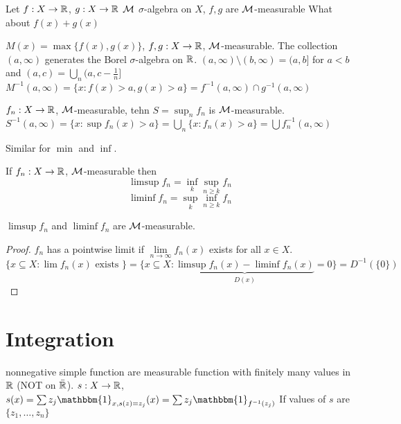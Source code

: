 Let $f: X \to \mathbb R$, $g: X \to \mathbb R$ $\mathcal M$ $\sigma$-algebra on $X$, $f, g$ are $\mathcal M$-measurable
What about $f(x) + g(x)$

$M(x) = \max\{f(x), g(x)\}$, $f,g: X \to \mathbb R$, $\mathcal M$-measurable.
The collection $(a, \infty)$ generates the Borel $\sigma$-algebra on $\mathbb R$.
$(a, \infty) \setminus (b, \infty) = (a, b]$ for $a < b$ and $(a, c) = \bigcup_n (a, c - \frac1n]$
$M^{-1}(a, \infty) = \{x : f(x) > a, g(x) > a\} = f^{-1}(a, \infty) \cap g^{-1}(a, \infty)$

$f_n: X \to \mathbb R$, $\mathcal M$-measurable, tehn $S = \sup_n f_n$ is $\mathcal M$-measurable.
$S^{-1}(a, \infty) = \{x : \sup f_n(x) > a\} = \bigcup_n \{x : f_n(x) > a\} = \bigcup f_n^{-1}(a, \infty)$

Similar for $\min$ and $\inf$.

\begin{definition}
If $f_n: X \to \mathbb R$, $\mathcal M$-measurable then \[\limsup f_n = \inf_k \sup_{n \ge k} f_n\]
\[\liminf f_n = \sup_k \inf_{n \ge k} f_n\]
\end{definition}

\begin{claim}
  $\limsup f_n$ and $\liminf f_n$ are $\mathcal M$-measurable.
\end{claim}

\begin{proof}
  $f_n$ has a pointwise limit if $\lim\limits_{n\to\infty}f_n(x)$ exists for all $x \in X$.
  $\{x \subseteq X : \lim f_n(x) \text{ exists }\} = \{x \subseteq X : \underbrace{\limsup f_n(x) - \liminf f_n(x)}_{D(x)} = 0\} = D^{-1}(\{0\})$
\end{proof}

\section{Integration}

\begin{definition}
  nonnegative simple function are measurable function with finitely many values in $\mathbb R$ (NOT on $\bar{\mathbb R}$).
  $s: X \to \mathbb R$, $s(x) = \sum z_j \mathbbm{1}_{x, s(z) = z_j}(x) = \sum z_j \mathbbm{1}_{f^{-1}({z_j})}$
  If values of $s$ are $\{z_1, \dotsc, z_n\}$
\end{definition}


